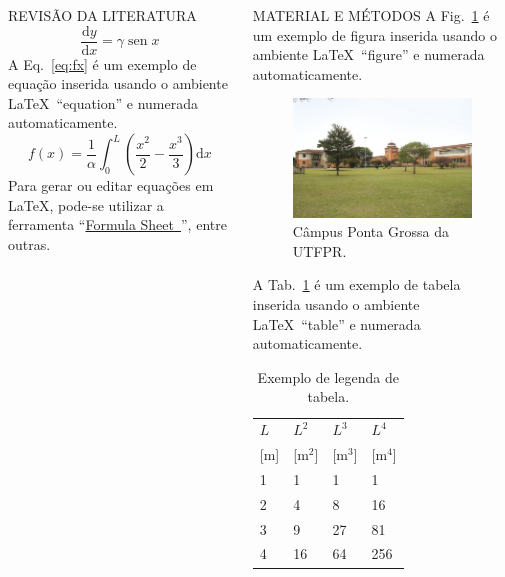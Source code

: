 \documentclass[%
  final,%
  english,%
  brazilian,%
]{beamer}
\begin{document}
\begin{frame}[t, fragile = singleslide]
\begin{columns}[t, onlytextwidth]
\begin{column}{0.49\textwidth}
\begin{block}{REVISÃO DA LITERATURA}
\[
\frac{\mathrm{d} y}{\mathrm{d} x} = \gamma \operatorname{sen} x
\]
A Eq.~\eqref{eq:fx} é um exemplo de equação inserida usando o ambiente \LaTeX\ \enquote{equation} e numerada automaticamente.
\begin{equation}\label{eq:fx}
f(x) = \frac{1}{\alpha} \int_0^L \left(\frac{x^2}{2} - \frac{x^3}{3}\right) \mathrm{d} x
\end{equation}
Para gerar ou editar equações em \LaTeX, pode-se utilizar a ferramenta \enquote{\href{http://formulasheet.com/}{Formula Sheet~\linkicon}}, entre outras.
\end{block}
%
\end{column}
%
\begin{column}{0.49\textwidth}
%
\begin{block}{MATERIAL E MÉTODOS}
A Fig.~\ref{fig:campuspontagrossa} é um exemplo de figura inserida usando o ambiente \LaTeX\ \enquote{figure} e numerada automaticamente.
\begin{figure}[!htb]
\centering%
\caption{Câmpus Ponta Grossa da UTFPR.}%
\label{fig:campuspontagrossa}
\includegraphics[width = 0.5\columnwidth]{./Figuras/campuspontagrossa}
\end{figure}
A Tab.~\ref{tab:Ldimens} é um exemplo de tabela inserida usando o ambiente \LaTeX\ \enquote{table} e numerada automaticamente.
\begin{table}[!htb]
\centering%
\small%
\caption{Exemplo de legenda de tabela.}%
\label{tab:Ldimens}
\begin{tabular*}{\columnwidth}{@{\extracolsep{\fill}}llll}
\toprule
$L$   & $L^2$     & $L^3$     & $L^4$     \\
{[m]} & {[m$^2$]} & {[m$^3$]} & {[m$^4$]} \\
\midrule
1     & 1         & 1         & 1         \\
2     & 4         & 8         & 16        \\
3     & 9         & 27        & 81        \\
4     & 16        & 64        & 256       \\

\end{tabular*}
\end{table}
\end{block}
\end{column}
\end{columns}
\end{frame}
\end{document}
